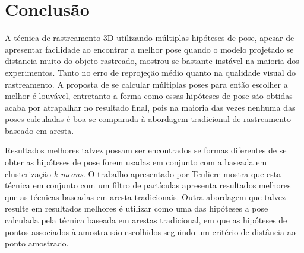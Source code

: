 \chapter{Conclusão}

A técnica de rastreamento 3D utilizando múltiplas hipóteses de pose, apesar de apresentar facilidade ao encontrar a melhor pose quando o modelo projetado se distancia muito do objeto rastreado, mostrou-se bastante instável na maioria dos experimentos. Tanto no erro de reprojeção médio quanto na qualidade visual do rastreamento. A proposta de se calcular múltiplas poses para então escolher a melhor é louvável, entretanto a forma como essas hipóteses de pose são obtidas acaba por atrapalhar no resultado final, pois na maioria das vezes nenhuma das poses calculadas é boa se comparada à abordagem tradicional de rastreamento baseado em aresta.

Resultados melhores talvez possam ser encontrados se formas diferentes de se obter as hipóteses de pose forem usadas em conjunto com a baseada em clusterização \emph{k-means}. O trabalho apresentado por Teuliere \cite{celine} mostra que esta técnica em conjunto com um filtro de partículas apresenta resultados melhores que as técnicas baseadas em aresta tradicionais. Outra abordagem que talvez resulte em resultados melhores é utilizar como uma das hipóteses a pose calculada pela técnica baseada em arestas tradicional, em que as hipóteses de pontos associados à amostra são escolhidos seguindo um critério de distância ao ponto amostrado.